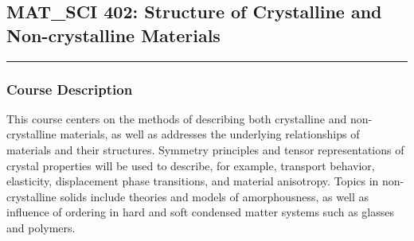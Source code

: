 	\subsection{MAT{\_}SCI 402: Structure of Crystalline and Non-crystalline Materials}
	\vspace{-1em} \hfill \rule{0.4\textwidth}{.4pt}\newline
	\null \hfill {} \newline
	\null \hfill {}
\normalfont
	\subsubsection*{Course Description}
	This course centers on the methods of describing both crystalline and non-crystalline materials, as well as addresses the underlying relationships of materials and their structures. Symmetry principles and tensor representations of crystal properties will be used to describe, for example, transport behavior, elasticity, displacement phase transitions, and material anisotropy. Topics in non-crystalline solids include theories and models of amorphousness, as well as influence of ordering in hard and soft condensed matter systems such as glasses and polymers.
